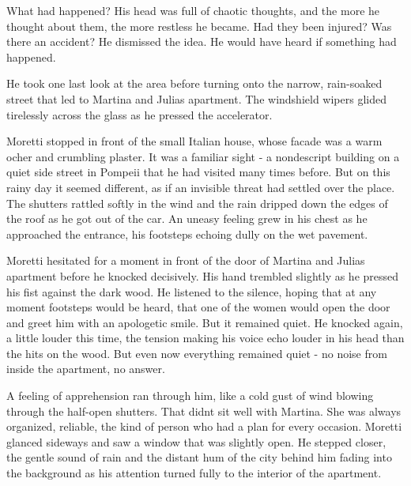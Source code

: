 \documentclass[
]{article}
\begin{document}
What had happened? His head was full of chaotic thoughts, and the more
he thought about them, the more restless he became. Had they been
injured? Was there an accident? He dismissed the idea. He would have
heard if something had happened.

He took one last look at the area before turning onto the narrow,
rain-soaked street that led to Martina and Julia\textquotesingle s
apartment. The windshield wipers glided tirelessly across the glass as
he pressed the accelerator.

Moretti stopped in front of the small Italian house, whose facade was a
warm ocher and crumbling plaster. It was a familiar sight - a
nondescript building on a quiet side street in Pompeii that he had
visited many times before. But on this rainy day it seemed different, as
if an invisible threat had settled over the place. The shutters rattled
softly in the wind and the rain dripped down the edges of the roof as he
got out of the car. An uneasy feeling grew in his chest as he approached
the entrance, his footsteps echoing dully on the wet pavement.

Moretti hesitated for a moment in front of the door of Martina and
Julia\textquotesingle s apartment before he knocked decisively. His hand
trembled slightly as he pressed his fist against the dark wood. He
listened to the silence, hoping that at any moment footsteps would be
heard, that one of the women would open the door and greet him with an
apologetic smile. But it remained quiet. He knocked again, a little
louder this time, the tension making his voice echo louder in his head
than the hits on the wood. But even now everything remained quiet - no
noise from inside the apartment, no answer.

A feeling of apprehension ran through him, like a cold gust of wind
blowing through the half-open shutters. That didn\textquotesingle t sit
well with Martina. She was always organized, reliable, the kind of
person who had a plan for every occasion. Moretti glanced sideways and
saw a window that was slightly open. He stepped closer, the gentle sound
of rain and the distant hum of the city behind him fading into the
background as his attention turned fully to the interior of the
apartment.
\end{document}
